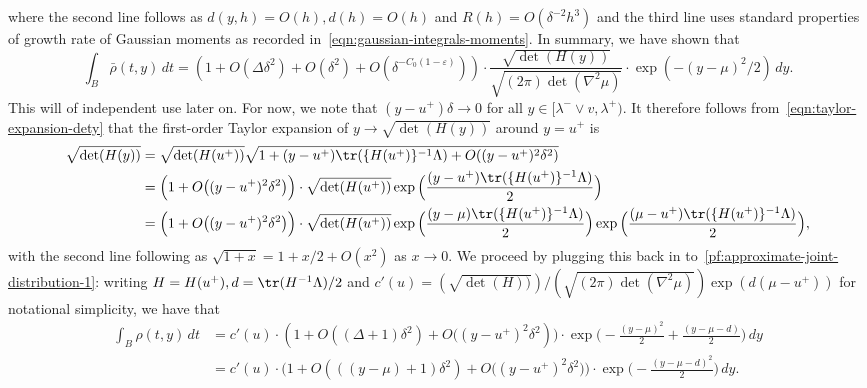 \documentclass{article}
\begin{document}
	where the second line follows as $d(y,h) = O(h), d(h) = O(h)$ and $R(h) = O(\delta^{-2}h^3)$ and the third line uses standard properties of growth rate of Gaussian moments as recorded in~\eqref{eqn:gaussian-integrals-moments}. In summary, we have shown that
	\begin{equation}
	\label{pf:approximate-joint-distribution-1}
		\int_{B} \bar{\rho}(t,y) \,dt = (1 + O(\Delta \delta^2) + O(\delta^2) + O(\delta^{-C_0(1 - \varepsilon)})) \cdot \frac{\sqrt{\det(H(y))}}{\sqrt{(2\pi)\det(\nabla^2 \mu)}} \cdot \exp(-(y - \mu)^2/2) \,dy.
	\end{equation}
	This will of independent use later on. For now, we note that $(y - u^+)\delta \to 0$ for all $y \in [\lambda^{-} \vee v,\lambda^{+})$. It therefore follows from~\eqref{eqn:taylor-expansion-dety} that the first-order Taylor expansion of $y \to \sqrt{\det(H(y))}$ around $y = u^{+}$ is
	\begin{equation*}
	\begin{aligned}
		\sqrt{\det(H(y))} 
		& = \sqrt{\det(H(u^+))}\sqrt{1 + (y - u^+) \tr(\{H(u^+)\}^{-1}\Lambda)  + O((y - u^+)^2\delta^2)} \\
		& = \Big(1 + O\big((y - u^+)^2\delta^2\big)\Big) \cdot  \sqrt{\det(H(u^+))} \exp\Big(\frac{(y - u^+) \tr(\{H(u^+)\}^{-1}\Lambda)}{2}\Big) \\
		& = \Big(1 + O\big((y - u^+)^2\delta^2\big)\Big) \cdot  \sqrt{\det(H(u^+))} \exp\Big(\frac{(y - \mu) \tr(\{H(u^+)\}^{-1}\Lambda)}{2}\Big) \exp\Big(\frac{(\mu - u^{+}) \tr(\{H(u^+)\}^{-1}\Lambda)}{2}\Big),
	\end{aligned}
	\end{equation*}
	with the second line following as $\sqrt{1 + x} = 1 + x/2 + O(x^2)$ as $x \to 0$. 	We proceed by plugging this back in to~\eqref{pf:approximate-joint-distribution-1}: writing $H = H(u^+), d = \tr(H^{-1}\Lambda)/2$ and $c'(u) = (\sqrt{\det(H))})/(\sqrt{(2\pi)\det(\nabla^2 \mu)}) \exp(d(\mu - u^{+}))$ for notational simplicity, we have that
	\begin{equation*}
	\label{pf:approximate-joint-distribution-2}
	\begin{aligned}
	\int_{B} \rho(t,y) \,dt
	& = c'(u) \cdot (1 + O((\Delta + 1) \delta^2) + O\big((y - u^+)^2\delta^2)) \cdot \exp\Big(-\frac{(y - \mu)^2}{2} + \frac{(y - \mu - d)}{2}\Big) \,dy \\
	& = c'(u) \cdot \Big(1 + O(((y - \mu) + 1) \delta^2) + O\big((y - u^+)^2\delta^2)\Big) \cdot \exp\Big(-\frac{(y - \mu - d)^2}{2}\Big) \,dy.
	 \end{aligned}
	\end{equation*}
\end{document}
